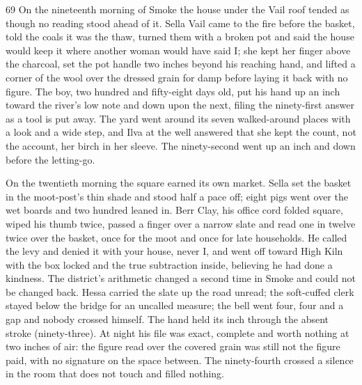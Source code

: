 
\scenebreak


\scenebreak


\scenebreak

\CRtailpiece
\begin{CRchronicle}{69}
On the nineteenth morning of Smoke the house under the Vail roof tended as though no reading stood ahead of it. Sella Vail came to the fire before the basket, told the coals it was the thaw, turned them with a broken pot and said the house would keep it where another woman would have said I; she kept her finger above the charcoal, set the pot handle two inches beyond his reaching hand, and lifted a corner of the wool over the dressed grain for damp before laying it back with no figure. The boy, two hundred and fifty-eight days old, put his hand up an inch toward the river’s low note and down upon the next, filing the ninety-first answer as a tool is put away. The yard went around its seven walked-around places with a look and a wide step, and Ilva at the well answered that she kept the count, not the account, her birch in her sleeve. The ninety-second went up an inch and down before the letting-go.

On the twentieth morning the square earned its own market. Sella set the basket in the moot-post’s thin shade and stood half a pace off; eight pigs went over the wet boards and two hundred leaned in. Berr Clay, his office cord folded square, wiped his thumb twice, passed a finger over a narrow slate and read one in twelve twice over the basket, once for the moot and once for late households. He called the levy and denied it with your house, never I, and went off toward High Kiln with the box locked and the true subtraction inside, believing he had done a kindness. The district’s arithmetic changed a second time in Smoke and could not be changed back. Hessa carried the slate up the road unread; the soft-cuffed clerk stayed below the bridge for an uncalled measure; the bell went four, four and a gap and nobody crossed himself. The hand held its inch through the absent stroke (ninety-three). At night his file was exact, complete and worth nothing at two inches of air: the figure read over the covered grain was still not the figure paid, with no signature on the space between. The ninety-fourth crossed a silence in the room that does not touch and filled nothing.


\end{CRchronicle}
